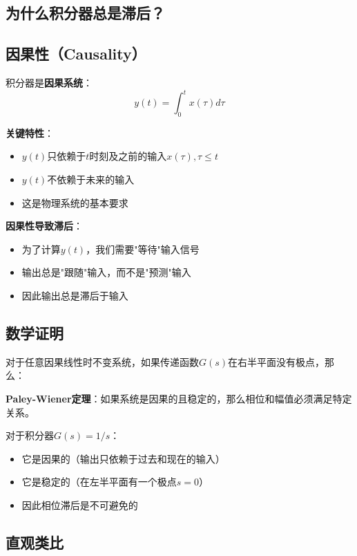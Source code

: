 \documentclass[12pt,a4paper]{article}
\begin{document}
\begin{enumerate}
\section{为什么积分器总是滞后？}

\subsection{因果性（Causality）}

积分器是\textbf{因果系统}：
\begin{equation}
y(t) = \int_0^t x(\tau) d\tau
\end{equation}

\textbf{关键特性}：
\begin{itemize}
\item $y(t)$只依赖于$t$时刻及之前的输入$x(\tau), \tau \leq t$
\item $y(t)$不依赖于未来的输入
\item 这是物理系统的基本要求
\end{itemize}

\textbf{因果性导致滞后}：
\begin{itemize}
\item 为了计算$y(t)$，我们需要"等待"输入信号
\item 输出总是"跟随"输入，而不是"预测"输入
\item 因此输出总是滞后于输入
\end{itemize}

\subsection{数学证明}

对于任意因果线性时不变系统，如果传递函数$G(s)$在右半平面没有极点，那么：

\textbf{Paley-Wiener定理}：如果系统是因果的且稳定的，那么相位和幅值必须满足特定关系。

对于积分器$G(s) = 1/s$：
\begin{itemize}
\item 它是因果的（输出只依赖于过去和现在的输入）
\item 它是稳定的（在左半平面有一个极点$s = 0$）
\item 因此相位滞后是不可避免的
\end{itemize}

\subsection{直观类比}


\end{enumerate}
\end{document}
